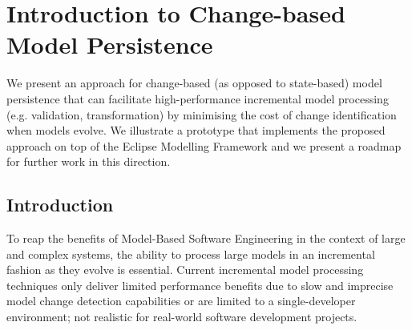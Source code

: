 \chapter{Introduction to Change-based Model Persistence}
We present an approach for change-based (as opposed to state-based) model persistence that can facilitate high-performance incremental model processing (e.g. validation, transformation) by minimising the cost of change identification when models evolve. We illustrate a prototype that implements the proposed approach on top of the Eclipse Modelling Framework and we present a roadmap for further work in this direction.

\section{Introduction}
\label{Introduction}


To reap the benefits of Model-Based Software Engineering in the context of large and complex systems, the ability to process large models in an incremental fashion as they evolve is essential. Current incremental model processing techniques only deliver limited performance benefits due to slow and imprecise model change detection capabilities or are limited to a single-developer environment; not realistic for real-world software development projects.

